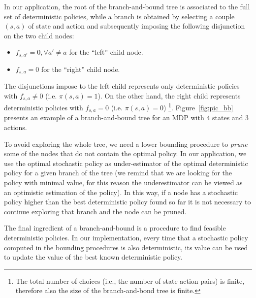 \documentclass[sigconf]{aamas}  %
\begin{document}
In our application, the root of the branch-and-bound tree is associated to the full set of deterministic policies, while a branch is obtained by selecting a couple $(s,a)$ of state and action and subsequently imposing the following disjunction on the two child nodes:
\begin{itemize}
\item $f_{s,a'}=0, \forall a'\neq a$ for the ``left'' child node.
\item $f_{s,a}=0$ for the ``right'' child node. 
\end{itemize} 
The disjunctions impose to the left child represents only deterministic policies with $f_{s,a}\neq 0$  (i.e. $\pi(s,a)=1$). On the other hand, the right child represents deterministic policies with $f_{s,a}=0$  (i.e. $\pi(s,a)=0$)
\footnote{The total number of choices (i.e., the number of state-action pairs) is finite, therefore also the size of the branch-and-bond tree is finite.}. Figure~\ref{fig:pic_bb} presents an example of a branch-and-bound tree for an MDP with $4$ states and $3$ actions. 
 

To avoid exploring the whole tree, we need a lower bounding procedure to \textit{prune} some of the nodes that do not contain the optimal policy. In our application, we use the optimal stochastic policy as under-estimator of the optimal deterministic policy for a given branch of the tree (we remind that we are looking for the policy with minimal value, for this reason the underestimator can be viewed as an optimistic estimation of the policy). In this way, if a node has a stochastic policy higher than the best deterministic policy found so far it is not necessary to continue exploring that branch and the node can be pruned.

The final ingredient of a branch-and-bound is a procedure to find feasible deterministic policies. In our implementation, every time that a stochastic policy computed in the bounding procedures is also deterministic, its value can be used to update the value of the best known deterministic policy. %
\end{document}
